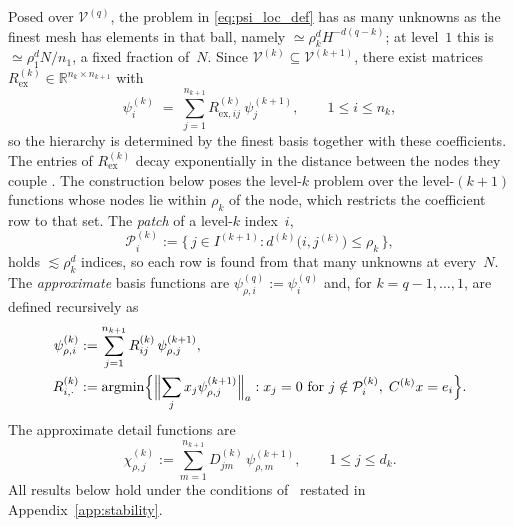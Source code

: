 \documentclass[hidelinks]{siamart}
\theoremstyle{nonumberplain}
\numberwithin{theorem}{section}
\begin{document}
Posed over $\mathcal{V}^{(q)}$, the problem in \eqref{eq:psi_loc_def}
has as many unknowns as the finest mesh has elements in that ball,
namely $\simeq \rho_k^d H^{-d(q-k)}$; at level~$1$ this is
$\simeq \rho_1^d N / n_1$, a fixed fraction of~$N$.  Since
$\mathcal{V}^{(k)} \subseteq \mathcal{V}^{(k+1)}$, there exist matrices
$R^{(k)}_{\mathrm{ex}} \in \mathbb{R}^{n_k \times n_{k+1}}$ with
\begin{equation}\label{eq:nesting_R}
  \psi^{(k)}_i \;=\; \sum_{j=1}^{n_{k+1}} R^{(k)}_{\mathrm{ex},ij}\,
  \psi^{(k+1)}_j , \qquad 1 \leq i \leq n_k ,
\end{equation}
so the hierarchy is determined by the finest basis together with these
coefficients.  The entries of $R^{(k)}_{\mathrm{ex}}$ decay exponentially
in the distance between the nodes they couple
\cite[Lemma~16.27]{Owhadi_Scovel_2019}.  The construction below poses
the level-$k$ problem over the level-$(k+1)$ functions whose nodes lie
within $\rho_k$ of the node, which restricts the coefficient row to that
set.  The \emph{patch} of a
level-$k$ index~$i$,
\begin{equation}\label{eq:patch_def}
  \mathcal{P}^{(k)}_i := \bigl\{\, j \in I^{(k+1)} :
    d^{(k)}\bigl(i, j^{(k)}\bigr) \leq \rho_k \,\bigr\} ,
\end{equation}
holds $\lesssim \rho_k^d$ indices, so each row is found from that many
unknowns at every~$N$.  The \emph{approximate} basis functions
are $\psi^{(q)}_{\rho,i} := \psi^{(q)}_i$ and, for $k = q-1, \ldots, 1$, are defined recursively as
\begin{equation}\label{eq:recursive_patch}
  \begin{aligned}
  \psi^{(k)}_{\rho,i} &:= \sum_{j=1}^{n_{k+1}} R^{(k)}_{ij}\,
    \psi^{(k+1)}_{\rho,j}, \\
  R^{(k)}_{i,\cdot} &:= \operatorname{argmin}
  \Bigl\{ \Bigl\| \sum_j x_j \psi^{(k+1)}_{\rho,j} \Bigr\|_a :
    x_j = 0 \text{ for } j \notin \mathcal{P}^{(k)}_i,\;
    C^{(k)} x = e_i \Bigr\} .
  \end{aligned}
\end{equation}
The approximate detail functions are
\begin{equation}\label{eq:localized_detail_basis}
  \chi^{(k)}_{\rho,j} := \sum_{m=1}^{n_{k+1}} D^{(k)}_{jm}\,
    \psi^{(k+1)}_{\rho,m}, \qquad 1 \leq j \leq d_k .
\end{equation}  All results
below hold under the conditions of~\cite{Owhadi_Scovel_2019} restated in
Appendix~\ref{app:stability}.
\end{document}
